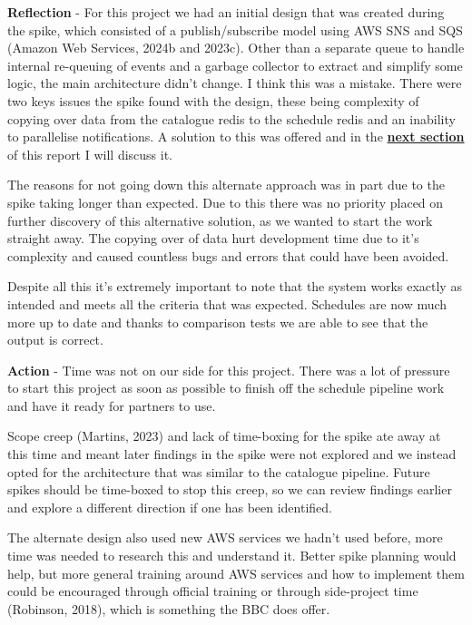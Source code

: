   \vspace{0.2cm}
  \textbf{Reflection} - For this project we had an initial design that was created during the spike, which consisted of a publish/subscribe model using
  AWS SNS and SQS (Amazon Web Services, 2024b and 2023c). Other than a separate queue to handle internal re-queuing of events and a garbage collector to 
  extract and simplify some logic, the main architecture didn't change. I think this was a mistake. There were two keys issues the spike found with the design,
  these being complexity of copying over data from the catalogue redis to the schedule redis and an inability to parallelise notifications. A solution to this 
  was offered and in the \hyperref[sec:dynamo]{\textbf{next section}} of this report I will discuss it. 

  The reasons for not going down this alternate approach was in part due to the spike taking longer than expected. Due to this there was no priority placed 
  on further discovery of this alternative solution, as we wanted to start the work straight away. The copying over of data hurt development time due to 
  it's complexity and caused countless bugs and errors that could have been avoided.

  Despite all this it's extremely important to note that the system works exactly as intended and meets all the criteria that was expected. Schedules are 
  now much more up to date and thanks to comparison tests we are able to see that the output is correct.

  \vspace{0.2cm}
  \textbf{Action} - Time was not on our side for this project. There was a lot of pressure to start this project as soon as possible to finish off the 
  schedule pipeline work and have it ready for partners to use.

  Scope creep (Martins, 2023) and lack of time-boxing for the spike ate away at this time and meant later findings in the spike were not explored and we 
  instead opted for the architecture that was similar to the catalogue pipeline. Future spikes should be time-boxed to stop this creep, 
  so we can review findings earlier and explore a different direction if one has been identified.

  The alternate design also used new AWS services we hadn't used before, more time was needed to research this and understand it. Better spike planning 
  would help, but more general training around AWS services and how to implement them could be encouraged through official training or through side-project
  time (Robinson, 2018), which is something the BBC does offer.

